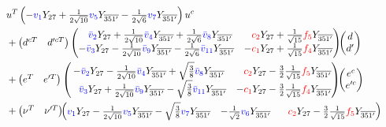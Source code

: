 \documentclass[a4paper,12pt]{article}
\def\yd{Y_{27}}
\def\yt{Y_{\overline{351'}}}
\def\RED{\textcolor{red}}
\def\BLUE{\textcolor{blue}}
\begin{document}
\begin{align}
&u^{T}\left(-\BLUE{v_1} \yd+\tfrac{1}{2\sqrt{10}} \BLUE{v_5}\yt-\tfrac{1}{2\sqrt{6}} \BLUE{v_7}\yt\right) u^c\nonumber\\
&+
\begin{pmatrix}
d^{cT} & d'^{cT}\\
\end{pmatrix}
\begin{pmatrix}
 \phantom{-}\BLUE{\bar{v}_2} \yd+\tfrac{1}{2\sqrt{10}} \BLUE{\bar{v}_4}\yt+\tfrac{1}{2\sqrt{6}} \BLUE{\bar{v}_8}\yt  & \phantom{-}\RED{c_2} \yd+\frac{1}{\sqrt{15}}\RED{f_5} \yt  \\
 -\BLUE{\bar{v}_3} \yd-\tfrac{1}{2\sqrt{10}} \BLUE{\bar{v}_9}\yt-\tfrac{1}{2\sqrt{6}} \BLUE{\bar{v}_{11}}\yt  & -\RED{c_1}\yd+\frac{1}{\sqrt{15}}\RED{f_4} \yt \\
\end{pmatrix}\!\!
\begin{pmatrix}
d \\
d'\\
\end{pmatrix} \nonumber\\
&+
\begin{pmatrix}
e^{T} & e'^{T}
\end{pmatrix}
\begin{pmatrix}
 -\BLUE{\bar{v}_2} \yd- \frac{1}{2\sqrt{10}} \BLUE{\bar{v}_4}\yt+ \sqrt{\tfrac{3}{8}} \BLUE{\bar{v}_8} \yt  & \phantom{-}\RED{c_2} \yd- \tfrac{3}{2}\frac{1}{\sqrt{15}} \RED{f_5} \yt  \\
 \phantom{-}\BLUE{\bar{v}_3} \yd+\frac{1}{2\sqrt{10}}\BLUE{\bar{v}_9}\yt-\sqrt{\tfrac{3}{8}}\BLUE{\bar{v}_{11}} \yt  & -\RED{c_1} \yd- \tfrac{3}{2}\frac{1}{\sqrt{15}} \RED{f_4} \yt \\
\end{pmatrix}\!\!
\begin{pmatrix}
e^c \\
e'^c\\
\end{pmatrix} &&\nonumber\\
&+
\begin{pmatrix}
\nu^{T} & \nu'^{T}\\
\end{pmatrix} \!\!
\begin{pmatrix}
 \BLUE{v_1} \yd-\tfrac{1}{2\sqrt{10}}\BLUE{v_5}\yt-\sqrt{\frac{3}{8}} \BLUE{v_7}\yt  & -\tfrac{1}{\sqrt{2}} \BLUE{v_6} \yt & \phantom{-}\RED{c_2} \yd-\tfrac{3}{2}\frac{1}{\sqrt{15}} \RED{f_5} \yt  \\

\end{pmatrix}
\end{align}
\end{document}
